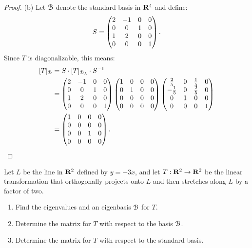 \documentclass[10pt,twoside,openany]{memoir}
\begin{document}
{\begin{proof}
        (b) Let $\mathcal{B}$ denote the standard basis in $\mathbf{R}^4$ and define:
            \begin{equation*}
            \begin{split}
                S = \left( \begin{matrix} 2 & -1 & 0 & 0 \\ 0 & 0 & 1 & 0 \\ 1 & 2 & 0 & 0 \\ 0 & 0 & 0 & 1 \end{matrix} \right).
            \end{split}
            \end{equation*}
        Since $T$ is diagonalizable, this means:
            \begin{equation*}
            \begin{split}
                [T]_{\mathcal{B}} 
                & = S \cdot [T]_{\mathcal{B}_\lambda}\cdot S^{-1} \\
                &= \left( \begin{matrix} 2 & -1 & 0 & 0 \\ 0 & 0 & 1 & 0 \\ 1 & 2 & 0 & 0 \\ 0 & 0 & 0 & 1 \end{matrix} \right) \left( \begin{matrix} 1 & 0 & 0 & 0 \\ 0 & 1 & 0 & 0 \\ 0 & 0 & 0 & 0 \\ 0 & 0 & 0 & 0 \end{matrix} \right) \left( \begin{matrix} \frac{2}{5} & 0 & \frac{1}{5} & 0 \\ -\frac{1}{5} & 0 & \frac{2}{5} & 0 \\ 0 & 1 & 0 & 0 \\ 0 & 0 & 0 & 1 \end{matrix} \right) \\
                & = \left( \begin{matrix}1 & 0 & 0 & 0 \\ 0 & 0 & 0 & 0 \\ 0 & 0 & 1 & 0  \\ 0 & 0 & 0 & 0 \end{matrix} \right).
            \end{split}
            \end{equation*}
        
    \end{proof}}
\begin{problem}[S19, P1]
    Let $L$ be the line in $\mathbf{R}^2$ defined by $y = -3x$, and let $T:\mathbf{R}^2 \rightarrow \mathbf{R}^2$ be the linear transformation that orthogonally projects onto $L$ and then stretches along $L$ by a factor of two.
        \begin{enumerate}[label = (\alph*),itemsep=1pt,topsep=3pt]
            \item Find the eigenvalues and an eigenbasis $\mathcal{B}$ for $T$.
            \item Determine the matrix for $T$ with respect to the basis $\mathcal{B}$.
            \item Determine the matrix for $T$ with respect to the standard basis.
        \end{enumerate}
\end{problem}
\end{document}
